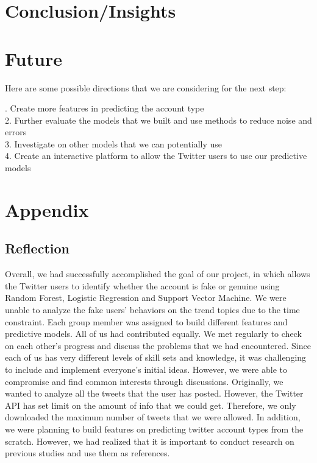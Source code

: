 \documentclass[a4paper, twoside, 12pt]{report}
\begin{document}
\section{Conclusion/Insights}

\section{Future}
Here are some possible directions that we are considering for the next step:

. Create more features in predicting the account type\\
2. Further evaluate the models that we built and use methods to reduce noise and errors\\
3. Investigate on other models that we can potentially use\\
4. Create an interactive platform to allow the Twitter users to use our predictive models\\


\section{Appendix}
\subsection{Reflection}
Overall, we had successfully accomplished the goal of our project, in which allows the Twitter users to identify whether the account is fake or genuine using Random Forest, Logistic Regression and Support Vector Machine. We were unable to analyze the fake users' behaviors on the trend topics due to the time constraint. Each group member was assigned to build different features and predictive models. All of us had contributed equally. We met regularly to check on each other's progress and discuss the problems that we had encountered. Since each of us has very different levels of skill sets and knowledge, it was challenging to include and implement everyone's initial ideas. However, we were able to compromise and find common interests through discussions. Originally, we wanted to analyze all the tweets that the user has posted. However, the Twitter API has set limit on the amount of info that we could get. Therefore, we only downloaded the maximum number of tweets that we were allowed. In addition, we were planning to build features on predicting twitter account types from the scratch. However, we had realized that it is important to conduct research on previous studies and use them as references. \\
\end{document}
